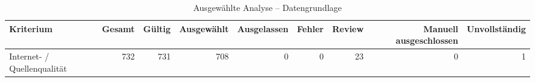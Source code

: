 \begin{table}[htbp]
\centering
\caption{Ausgewählte Analyse -- Datengrundlage}
\begin{tabular}{lrrrrrrrr}
\toprule
Kriterium & Gesamt & Gültig & Ausgewählt & Ausgelassen & Fehler & Review & Manuell ausgeschlossen & Unvollständig \\
\midrule
Internet- / Quellenqualität & 732 & 731 & 708 & 0 & 0 & 23 & 0 & 1 \\
\bottomrule
\end{tabular}
\end{table}

